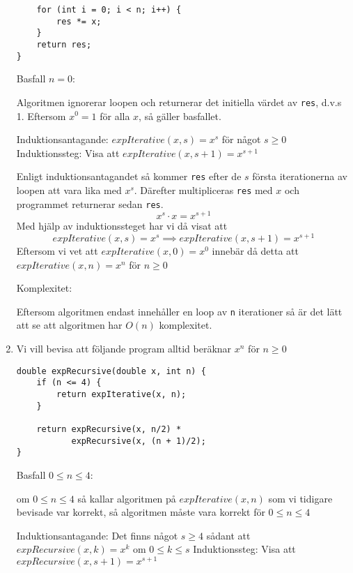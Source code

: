 \documentclass{article}
\begin{document}
\begin{enumerate}
\begin{lstlisting}
    for (int i = 0; i < n; i++) {
        res *= x;
    }
    return res;
}
\end{lstlisting}
Basfall \(n=0\):

Algoritmen ignorerar loopen och returnerar det initiella värdet av \texttt{res}, d.v.s 1. Eftersom \(x^0=1\) för alla \(x\), så gäller basfallet.

Induktionsantagande: \(expIterative(x, s)=x^s\) för något \(s \geq 0\) \newline
Induktionssteg: Visa att \(expIterative(x, s+1)=x^{s+1}\) \newline

Enligt induktionsantagandet så kommer \texttt{res} efter de \(s\) första iterationerna av loopen att vara lika med \(x^s\). Därefter multipliceras \texttt{res} med \(x\) och programmet returnerar sedan \texttt{res}.
\[x^s \cdot x = x^{s+1}\]
Med hjälp av induktionssteget har vi då visat att
\[expIterative(x, s)=x^s \implies expIterative(x, s+1)=x^{s+1}\]
Eftersom vi vet att \(expIterative(x, 0)=x^0\) innebär då detta att \(expIterative(x, n)=x^n\) för \(n \geq 0\) \newline

Komplexitet: \newline

Eftersom algoritmen endast innehåller en loop av \texttt{n} iterationer så är det lätt att se att algoritmen har \(O(n)\) komplexitet.
\vspace*{\baselineskip}
  \item
    Vi vill bevisa att följande program alltid beräknar \(x^n\) för \(n \geq 0\)
  \begin{lstlisting}
double expRecursive(double x, int n) {
    if (n <= 4) {
        return expIterative(x, n);
    }

    return expRecursive(x, n/2) *
           expRecursive(x, (n + 1)/2);
}
\end{lstlisting}
Basfall \(0 \leq n \leq 4\):

om \(0 \leq n \leq 4\) så kallar algoritmen på \(expIterative(x, n)\) som vi tidigare bevisade var korrekt, så algoritmen måste vara korrekt för \(0 \leq n \leq 4\) \newline

Induktionsantagande: Det finns något \(s \geq 4\) sådant att \(expRecursive(x, k) = x^k\) om \(0 \leq k \leq s\) \newline
Induktionssteg: Visa att \(expRecursive(x, s+1)=x^{s+1}\) \newline


\end{enumerate}
\end{document}
